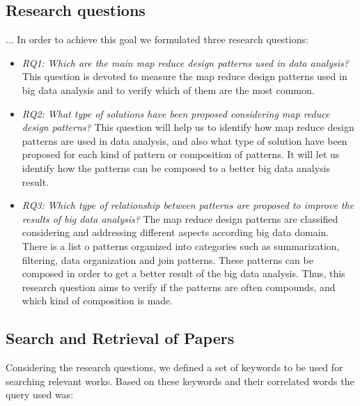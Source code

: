 \subsection{Research questions}
\label{sec:ResearchQuestions}

... In order to achieve this goal we formulated three research questions:

\begin{itemize}
\item {\em RQ1: Which are the main map reduce design patterns used in data
analysis?} This question is devoted to measure the map reduce design patterns
used in big data analysis and to verify which of them are the most common.

\item {\em RQ2: What type of solutions have been proposed considering map
reduce design patterns?} This question will help us to identify how map reduce
design patterns are used in data analysis, and also
what type of solution have been proposed for each kind of pattern or
composition of patterns. It will let us identify how the patterns can be
composed to a better big data analysis result.
 
\item  {\em RQ3: Which type of relationship between patterns are proposed to
improve the results of big data analysis?} The map reduce design patterns are
classified considering and addressing different aspects
according big data domain. There is a list o patterns organized into categories
such as summarization, filtering, data organization and join patterns. These
patterns can be composed in order to get a better result of the big data
analysis. Thus, this research question aims to verify if the patterns are often
compounds, and which kind of composition is made.


\end{itemize}

\subsection{Search and Retrieval of Papers}

Considering the research questions, we defined a set of keywords to be used for
searching relevant works. Based on these keywords and their
correlated words the query used was:        
 
